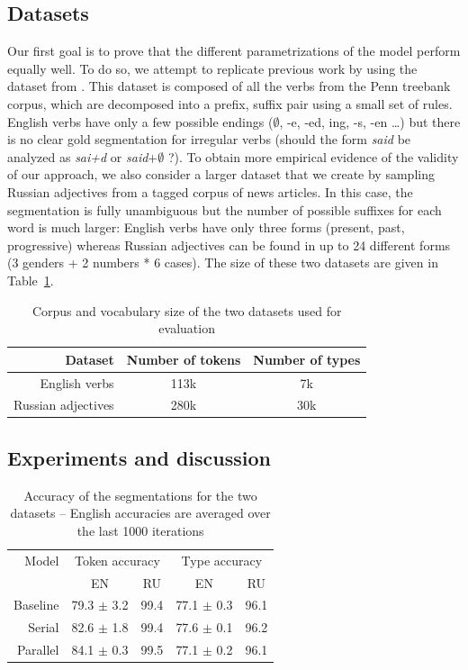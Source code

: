 \subsection{Datasets}
Our first goal is to prove that the different parametrizations of the model perform equally well. To do so, we attempt to replicate previous work by using the dataset from \cite{goldwater2011}. This dataset is composed of all the verbs from the Penn treebank corpus, which are decomposed into a prefix, suffix pair using a small set of rules. English verbs have only a few possible endings ($\emptyset$, -e, -ed, ing, -s, -en \dots) but there is no clear gold segmentation for irregular verbs (should the form \textit{said} be analyzed as \textit{sai+d} or \textit{said}+$\emptyset$ ?). To obtain more empirical evidence of the validity of our approach, we also consider a larger dataset that we create by sampling Russian adjectives from a tagged corpus of news articles. In this case, the segmentation is fully unambiguous but the number of possible suffixes for each word is much larger: English verbs have only three forms (present, past, progressive) whereas Russian adjectives can be found in up to 24 different forms (3 genders + 2 numbers * 6 cases). The size of these two datasets are given in Table~\ref{tab:datasets}.

\begin{table}[h]
    \center
    \begin{tabular}{r c c}
        \toprule
        Dataset & Number of tokens & Number of types \\
        \midrule
  English verbs & 113k & 7k \\
        Russian adjectives & 280k & 30k \\
        \bottomrule
    \end{tabular}
    \caption{Corpus and vocabulary size of the two datasets used for evaluation}
    \label{tab:datasets}
\end{table}

\subsection{Experiments and discussion}

\begin{table}[h]
    \center
    \begin{tabular}{r c c c c}
        \toprule
        Model & \multicolumn{2}{c}{Token accuracy} & \multicolumn{2}{c}{Type accuracy} \\
        \cmidrule(r){2-3} \cmidrule(r){4-5}
        & EN & RU & EN & RU \\
        \midrule
        Baseline & 79.3 $\pm$ 3.2 & 99.4 & 77.1 $\pm$ 0.3 & 96.1 \\
          Serial & 82.6 $\pm$ 1.8 & 99.4 & 77.6 $\pm$ 0.1 & 96.2 \\
        Parallel & 84.1 $\pm$ 0.3 & 99.5 & 77.1 $\pm$ 0.2 & 96.1 \\
        \bottomrule
    \end{tabular}
    \caption{Accuracy of the segmentations for the two datasets -- English accuracies are averaged over the last 1000 iterations}
    \label{tab:accuracy}
\end{table}

